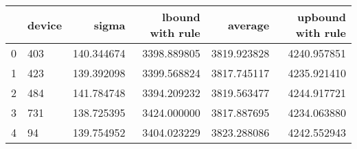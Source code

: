 \begin{tabular}{llrrrr}
\toprule
{} & device &       sigma &  lbound with rule &      average &  upbound with rule \\
\midrule
0 &    403 &  140.344674 &       3398.889805 &  3819.923828 &        4240.957851 \\
1 &    423 &  139.392098 &       3399.568824 &  3817.745117 &        4235.921410 \\
2 &    484 &  141.784748 &       3394.209232 &  3819.563477 &        4244.917721 \\
3 &    731 &  138.725395 &       3424.000000 &  3817.887695 &        4234.063880 \\
4 &     94 &  139.754952 &       3404.023229 &  3823.288086 &        4242.552943 \\
\bottomrule
\end{tabular}
